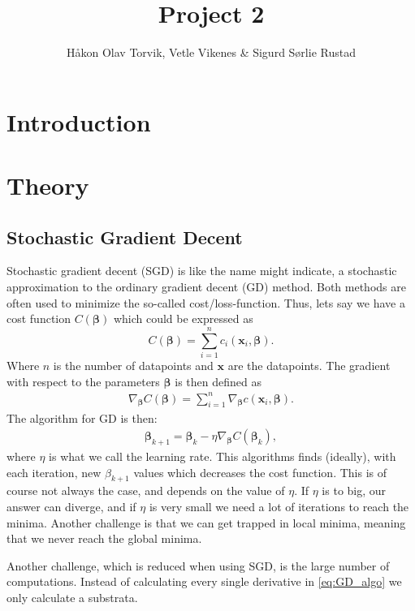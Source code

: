 \documentclass[12pt]{extarticle}
\author{\Large Håkon Olav Torvik, Vetle Vikenes \& Sigurd Sørlie Rustad}
\title{\Huge Project 2}
\affiliation{\large FYS-STK4155 – Applied Data Analysis and Machine Learning
\\Autumn 2021\\Department of Physics\\University of Oslo\\\\\today}
\begin{document}
\maketitle

\section{Introduction}
\section{Theory}
\subsection*{Stochastic Gradient Decent}
Stochastic gradient decent (SGD) is like the name might indicate, a stochastic approximation to the ordinary gradient decent (GD) method. Both methods are often used to minimize the so-called cost/loss-function. Thus, lets say we have a cost function $C(\boldsymbol{\beta})$ which could be expressed as
\begin{equation*}
	C(\boldsymbol{\beta}) = \sum_{i = 1}^{n}c_i(\mathbf{x}_i, \boldsymbol{\beta}).
\end{equation*}
Where $n$ is the number of datapoints and $\mathbf x$ are the datapoints. The gradient with respect to the parameters $\boldsymbol{\beta}$ is then defined as
\begin{align*}
	\nabla_{\boldsymbol{\beta}} C(\boldsymbol{\beta}) = \sum_{i = 1}^{n} \nabla_{\boldsymbol{\beta}} c(\mathbf{x}_i, \boldsymbol{\beta}).
\end{align*}
The algorithm for GD is then:
\begin{align}
	\boldsymbol{\beta}_{k+1} = \boldsymbol{\beta}_k - \eta \nabla_{\boldsymbol{\beta}} C(\boldsymbol{\beta}_k),
	\label{eq:GD_algo}
\end{align}
where $\eta$ is what we call the learning rate. This algorithms finds (ideally), with each iteration, new $\beta_{k+1}$ values which decreases the cost function. This is of course not always the case, and depends on the value of $\eta$. If $\eta$ is to big, our answer can diverge, and if $\eta$ is very small we need a lot of iterations to reach the minima. Another challenge is that we can get trapped in local minima, meaning that we never reach the global minima. 

Another challenge, which is reduced when using SGD, is the large number of computations. Instead of calculating every single derivative in \eqref{eq:GD_algo} we only calculate a substrata.
\end{document}
